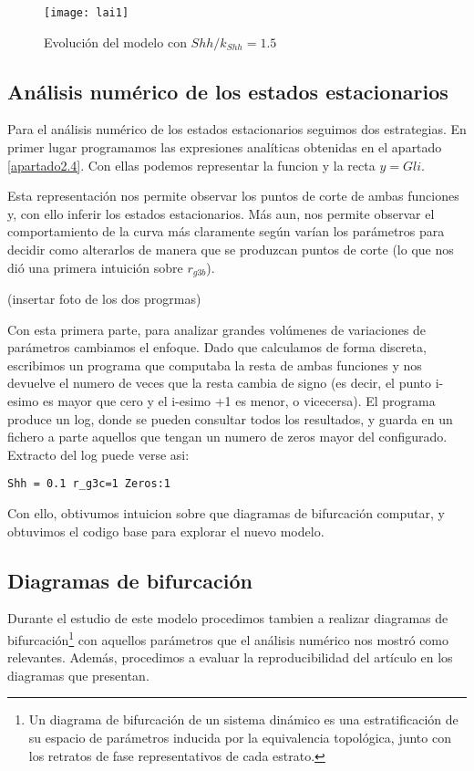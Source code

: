 \begin{figure}[h]
	\texttt{[image: lai1]}
	\centering
	\caption{Evolución del modelo \cite{schaffer} con $Shh/k_{Shh}=1.5$}
	\label{lai2}
\end{figure}

\subsection{Análisis numérico de los estados estacionarios}

Para el análisis numérico de los estados estacionarios seguimos dos estrategias. 
En primer lugar programamos las expresiones analíticas obtenidas en el apartado \ref{apartado2.4}. Con ellas podemos representar la funcion y la recta $y=Gli$. 

Esta representación nos permite observar los puntos de corte de ambas funciones y, con ello inferir los estados estacionarios. Más aun, nos permite observar el comportamiento de la curva más claramente según varían los parámetros para decidir como alterarlos de manera que se produzcan puntos de corte (lo que nos dió una primera intuición sobre $r_{g3b}$).

(insertar foto de los dos progrmas)

Con esta primera parte, para analizar grandes volúmenes de variaciones de parámetros cambiamos el enfoque. Dado que calculamos de forma discreta, escribimos un programa que computaba la resta de ambas funciones y nos devuelve el numero de veces que la resta cambia de signo (es decir, el punto i-esimo es mayor que cero y el i-esimo +1 es menor, o vicecersa).
El programa produce un log, donde se pueden consultar todos los resultados, y guarda en un fichero a parte aquellos que tengan un numero de zeros mayor del configurado.
Extracto del log puede verse asi:
\begin{verbatim}
Shh = 0.1 r_g3c=1 Zeros:1
\end{verbatim}

Con ello, obtivumos intuicion sobre que diagramas de bifurcación computar, y obtuvimos el codigo base para explorar el nuevo modelo.



\subsection{Diagramas de bifurcación}
Durante el estudio de este modelo procedimos tambien a realizar diagramas de bifurcación\footnote{Un diagrama de bifurcación de un sistema dinámico es una estratificación de su espacio de parámetros inducida por la equivalencia topológica, junto con los retratos de fase representativos de cada estrato.} con aquellos parámetros que el análisis numérico nos mostró como relevantes. Además, procedimos a evaluar la reproducibilidad del artículo en los diagramas que presentan. 

